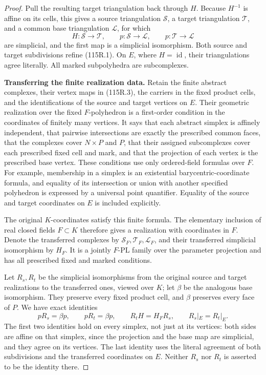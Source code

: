 \begin{proof}
Pull the resulting target triangulation back through \(H\). Because \(H^{-1}\) is affine on its cells, this gives a source triangulation \(\mathcal S\), a target triangulation \(\mathcal T\), and a common base triangulation \(\mathcal L\), for which
\[
 H:\mathcal S\longrightarrow\mathcal T,\qquad
 p:\mathcal S\longrightarrow\mathcal L,\qquad
 p:\mathcal T\longrightarrow\mathcal L
 \tag{115R.3}
\]
are simplicial, and the first map is a simplicial isomorphism. Both source and target subdivisions refine (115R.1). On \(E\), where \(H=\operatorname{id}\), their triangulations agree literally. All marked subpolyhedra are subcomplexes.

\textbf{Transferring the finite realization data.}
Retain the finite abstract complexes, their vertex maps in (115R.3), the carriers in the fixed product cells, and the identifications of the source and target vertices on \(E\). Their geometric realization over the fixed \(F\)-polyhedron is a first-order condition in the coordinates of finitely many vertices. It says that each abstract simplex is affinely independent, that pairwise intersections are exactly the prescribed common faces, that the complexes cover \(N\times P\) and \(P\), that their assigned subcomplexes cover each prescribed fixed cell and mark, and that the projection of each vertex is the prescribed base vertex. These conditions use only ordered-field formulas over \(F\). For example, membership in a simplex is an existential barycentric-coordinate formula, and equality of its intersection or union with another specified polyhedron is expressed by a universal point quantifier. Equality of the source and target coordinates on \(E\) is included explicitly.

The original \(K\)-coordinates satisfy this finite formula. The elementary inclusion of real closed fields \(F\subset K\) therefore gives a realization with coordinates in \(F\). Denote the transferred complexes by
\(\mathcal S_F,\mathcal T_F,\mathcal L_F\), and their transferred simplicial isomorphism by \(H_F\). It is a jointly \(F\)-PL family over the parameter projection and has all prescribed fixed and marked conditions.

Let \(R_s,R_t\) be the simplicial isomorphisms from the original source and target realizations to the transferred ones, viewed over \(K\); let \(\beta\) be the analogous base isomorphism. They preserve every fixed product cell, and \(\beta\) preserves every face of \(P\). We have exact identities
\[
 pR_s=\beta p,\qquad pR_t=\beta p,\qquad
 R_tH=H_FR_s,\qquad R_s|_E=R_t|_E.
 \tag{115R.4}
\]
The first two identities hold on every simplex, not just at its vertices: both sides are affine on that simplex, since the projection and the base map are simplicial, and they agree on its vertices. The last identity uses the literal agreement of both subdivisions and the transferred coordinates on \(E\). Neither \(R_s\) nor \(R_t\) is asserted to be the identity there.


\end{proof}
